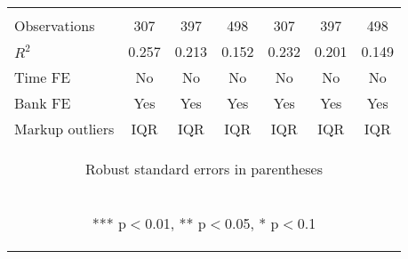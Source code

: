 \begin{tabular}{lcccccc}
\vspace{4pt} & \begin{footnotesize}\end{footnotesize} & \begin{footnotesize}\end{footnotesize} & \begin{footnotesize}\end{footnotesize} & \begin{footnotesize}\end{footnotesize} & \begin{footnotesize}\end{footnotesize} & \begin{footnotesize}\end{footnotesize} \\
Observations & 307 & 397 & 498 & 307 & 397 & 498 \\
$R^2$ & 0.257 & 0.213 & 0.152 & 0.232 & 0.201 & 0.149 \\
Time FE & No & No & No & No & No & No \\
Bank FE & Yes & Yes & Yes & Yes & Yes & Yes \\
 Markup outliers & IQR & IQR & IQR & IQR & IQR & IQR \\ \hline
\multicolumn{7}{c}{\begin{footnotesize} Robust standard errors in parentheses\end{footnotesize}} \\
\multicolumn{7}{c}{\begin{footnotesize} *** p$<$0.01, ** p$<$0.05, * p$<$0.1\end{footnotesize}} \\
\end{tabular}


